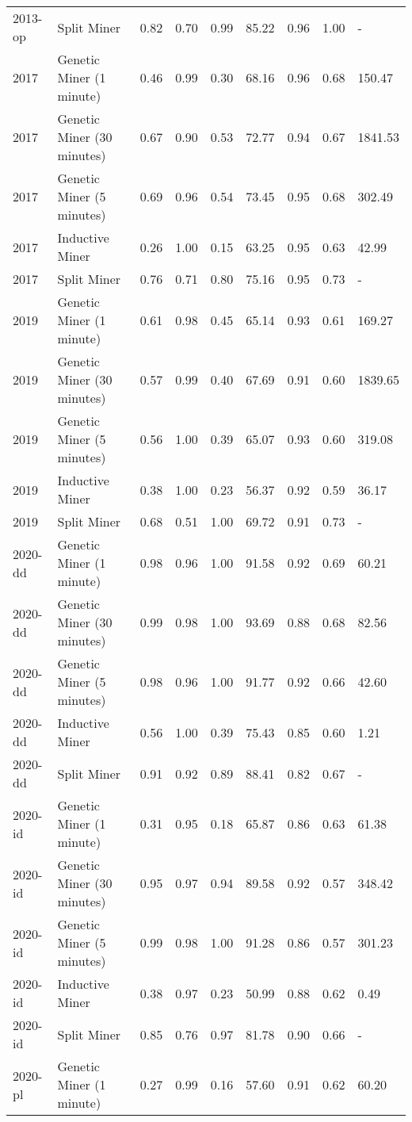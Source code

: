 \begin{tabular}{llrrrrrrl}
2013-op & Split Miner & 0.82 & 0.70 & 0.99 & 85.22 & 0.96 & 1.00 & - \\
2017 & Genetic Miner (1 minute) & 0.46 & 0.99 & 0.30 & 68.16 & 0.96 & 0.68 & 150.47 \\
2017 & Genetic Miner (30 minutes) & 0.67 & 0.90 & 0.53 & 72.77 & 0.94 & 0.67 & 1841.53 \\
2017 & Genetic Miner (5 minutes) & 0.69 & 0.96 & 0.54 & 73.45 & 0.95 & 0.68 & 302.49 \\
2017 & Inductive Miner & 0.26 & 1.00 & 0.15 & 63.25 & 0.95 & 0.63 & 42.99 \\
2017 & Split Miner & 0.76 & 0.71 & 0.80 & 75.16 & 0.95 & 0.73 & - \\
2019 & Genetic Miner (1 minute) & 0.61 & 0.98 & 0.45 & 65.14 & 0.93 & 0.61 & 169.27 \\
2019 & Genetic Miner (30 minutes) & 0.57 & 0.99 & 0.40 & 67.69 & 0.91 & 0.60 & 1839.65 \\
2019 & Genetic Miner (5 minutes) & 0.56 & 1.00 & 0.39 & 65.07 & 0.93 & 0.60 & 319.08 \\
2019 & Inductive Miner & 0.38 & 1.00 & 0.23 & 56.37 & 0.92 & 0.59 & 36.17 \\
2019 & Split Miner & 0.68 & 0.51 & 1.00 & 69.72 & 0.91 & 0.73 & - \\
2020-dd & Genetic Miner (1 minute) & 0.98 & 0.96 & 1.00 & 91.58 & 0.92 & 0.69 & 60.21 \\
2020-dd & Genetic Miner (30 minutes) & 0.99 & 0.98 & 1.00 & 93.69 & 0.88 & 0.68 & 82.56 \\
2020-dd & Genetic Miner (5 minutes) & 0.98 & 0.96 & 1.00 & 91.77 & 0.92 & 0.66 & 42.60 \\
2020-dd & Inductive Miner & 0.56 & 1.00 & 0.39 & 75.43 & 0.85 & 0.60 & 1.21 \\
2020-dd & Split Miner & 0.91 & 0.92 & 0.89 & 88.41 & 0.82 & 0.67 & - \\
2020-id & Genetic Miner (1 minute) & 0.31 & 0.95 & 0.18 & 65.87 & 0.86 & 0.63 & 61.38 \\
2020-id & Genetic Miner (30 minutes) & 0.95 & 0.97 & 0.94 & 89.58 & 0.92 & 0.57 & 348.42 \\
2020-id & Genetic Miner (5 minutes) & 0.99 & 0.98 & 1.00 & 91.28 & 0.86 & 0.57 & 301.23 \\
2020-id & Inductive Miner & 0.38 & 0.97 & 0.23 & 50.99 & 0.88 & 0.62 & 0.49 \\
2020-id & Split Miner & 0.85 & 0.76 & 0.97 & 81.78 & 0.90 & 0.66 & - \\
2020-pl & Genetic Miner (1 minute) & 0.27 & 0.99 & 0.16 & 57.60 & 0.91 & 0.62 & 60.20 \\

\end{tabular}
